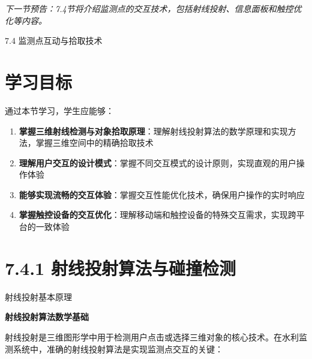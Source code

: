\emph{下一节预告：7.4节将介绍监测点的交互技术，包括射线投射、信息面板和触控优化等内容。}

 7.4 监测点互动与拾取技术

\section{学习目标}

通过本节学习，学生应能够：

\begin{enumerate}
\def\labelenumi{\arabic{enumi}.}
\tightlist
\item
  \textbf{掌握三维射线检测与对象拾取原理}：理解射线投射算法的数学原理和实现方法，掌握三维空间中的精确拾取技术
\item
  \textbf{理解用户交互的设计模式}：掌握不同交互模式的设计原则，实现直观的用户操作体验
\item
  \textbf{能够实现流畅的交互体验}：掌握交互性能优化技术，确保用户操作的实时响应
\item
  \textbf{掌握触控设备的交互优化}：理解移动端和触控设备的特殊交互需求，实现跨平台的一致体验
\end{enumerate}

\section{7.4.1 射线投射算法与碰撞检测}

 射线投射基本原理

\textbf{射线投射算法数学基础}

射线投射是三维图形学中用于检测用户点击或选择三维对象的核心技术。在水利监测系统中，准确的射线投射算法是实现监测点交互的关键：

